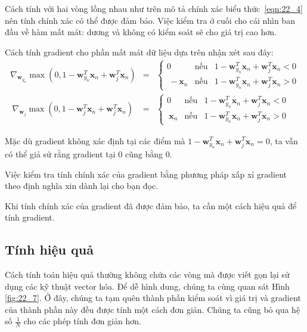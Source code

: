  
Cách tính với hai vòng  lồng nhau như trên mô tả chính xác
biểu thức~\eqref{eqn:22_4} nên tính chính xác có thể được đảm bảo. Việc kiểm tra ở cuối cho cái nhìn ban đầu về hàm mất
mát: dương và không có kiểm soát sẽ cho giá trị cao hơn. 
 
Cách tính gradient cho phần mất mát dữ liệu dựa trên nhận xét sau
đây:
\begin{eqnarray} 
\label{eqn:22_5}
\nabla_{\mathbf{w}_{y_n}}\max(0, 1 - \mathbf{w}_{y_n}^T \mathbf{x}_n + \mathbf{w}_j^T\mathbf{x}_n) &=&  
\left\{ 
\begin{matrix} 
0 & \text{nếu}& 1 - \mathbf{w}_{y_n}^T \mathbf{x}_n + \mathbf{w}_j^T\mathbf{x}_n < 0 \\\ 
-\mathbf{x}_n & \text{nếu} &1 - \mathbf{w}_{y_n}^T \mathbf{x}_n + \mathbf{w}_j^T\mathbf{x}_n > 0 
\end{matrix} 
\right.\\\ 
\label{eqn:22_6}
\nabla_{\mathbf{w}_{j}}\max(0, 1 - \mathbf{w}_{j}^T \mathbf{x}_n + \mathbf{w}_j^T\mathbf{x}_n) &=&  
\left\{ 
\begin{matrix} 
0 & \text{nếu}& 1 - \mathbf{w}_{y_n}^T \mathbf{x}_n + \mathbf{w}_j^T\mathbf{x}_n < 0 \\\ 
\mathbf{x}_n & \text{nếu} &1 - \mathbf{w}_{y_n}^T \mathbf{x}_n + \mathbf{w}_j^T\mathbf{x}_n > 0 
\end{matrix} 
\right.  
\end{eqnarray} 
 
Mặc dù gradient không xác định tại các điểm mà $1 - \mathbf{w}_{y_n}^T \mathbf{x}_n + \mathbf{w}_j^T\mathbf{x}_n = 0$, ta vẫn có thể giả sử rằng gradient tại 0 cũng bằng 0.  

Việc kiểm tra tính chính xác của gradient bằng phương pháp xấp xỉ gradient theo định nghĩa xin dành lại cho bạn đọc. 
 
Khi tính chính xác của gradient đã được đảm bảo, ta cần một cách hiệu quả để tính gradient. 
 
 
 
\subsection{Tính hiệu quả}
 

Cách tính toán hiệu quả thường không chứa các vòng  mà được
viết gọn lại sử dụng các kỹ thuật vector hóa. Để dễ hình dung, chúng ta cùng
quan sát Hình \ref{fig:22_7}. Ở đây, chúng ta tạm quên thành phần kiểm soát vì
giá trị và gradient của thành phần này đều được tính một cách đơn giản. Chúng ta cũng
bỏ qua hệ số $\frac{1}{N}$ cho các phép tính đơn giản hơn.
 

